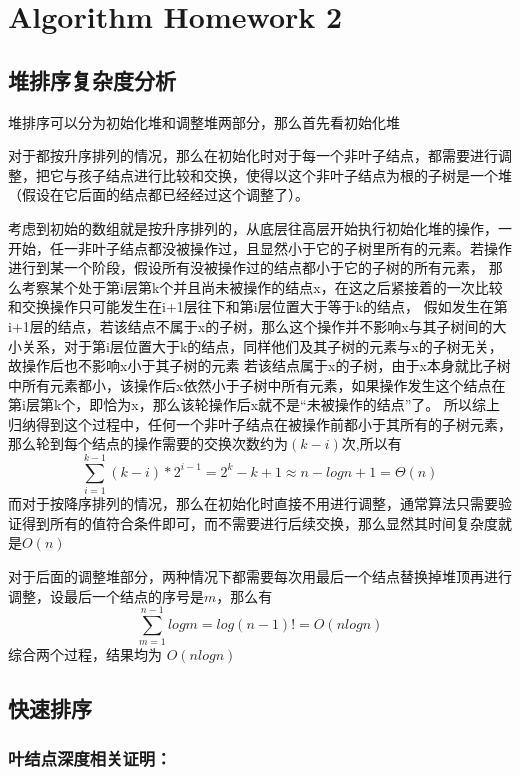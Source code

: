 \documentclass[cn,11pt,chinese]{elegantbook}
\begin{document}
\chapter{Algorithm Homework 2}

\section{堆排序复杂度分析}

堆排序可以分为初始化堆和调整堆两部分，那么首先看初始化堆

对于都按升序排列的情况，那么在初始化时对于每一个非叶子结点，都需要进行调整，把它与孩子结点进行比较和交换，使得以这个非叶子结点为根的子树是一个堆（假设在它后面的结点都已经经过这个调整了）。

考虑到初始的数组就是按升序排列的，从底层往高层开始执行初始化堆的操作，一开始，任一非叶子结点都没被操作过，且显然小于它的子树里所有的元素。若操作进行到某一个阶段，假设所有没被操作过的结点都小于它的子树的所有元素，
那么考察某个处于第i层第k个并且尚未被操作的结点x，在这之后紧接着的一次比较和交换操作只可能发生在i+1层往下和第i层位置大于等于k的结点，
假如发生在第i+1层的结点，若该结点不属于x的子树，那么这个操作并不影响x与其子树间的大小关系，对于第i层位置大于k的结点，同样他们及其子树的元素与x的子树无关，故操作后也不影响x小于其子树的元素
若该结点属于x的子树，由于x本身就比子树中所有元素都小，该操作后x依然小于子树中所有元素，如果操作发生这个结点在第i层第k个，即恰为x，那么该轮操作后x就不是“未被操作的结点”了。
所以综上归纳得到这个过程中，任何一个非叶子结点在被操作前都小于其所有的子树元素，那么轮到每个结点的操作需要的交换次数约为$(k-i)$次,所以有
$$\sum\limits_{i=1}^{k-1} (k-i)*2^{i-1} = 2^k-k+1 \approx  n-logn+1 = \varTheta (n)$$
而对于按降序排列的情况，那么在初始化时直接不用进行调整，通常算法只需要验证得到所有的值符合条件即可，而不需要进行后续交换，那么显然其时间复杂度就是$O (n)$

对于后面的调整堆部分，两种情况下都需要每次用最后一个结点替换掉堆顶再进行调整，设最后一个结点的序号是$m$，那么有
$$\sum\limits_{m=1}^{n-1}logm = log(n-1)! = O (nlogn)$$
综合两个过程，结果均为 $O (nlogn)$

\section{快速排序}

\subsection{叶结点深度相关证明：}
\end{document}
